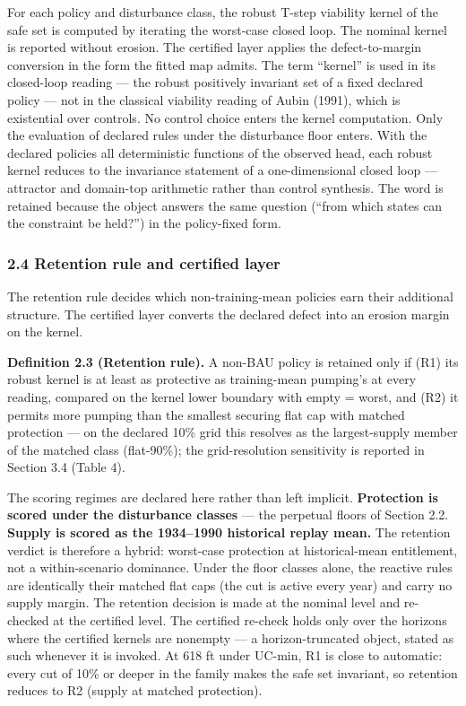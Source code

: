 \documentclass[11pt]{article}
\begin{document}
For each policy and disturbance class, the robust T-step viability
kernel of the safe set is computed by iterating the worst-case closed
loop. The nominal kernel is reported without erosion. The certified
layer applies the defect-to-margin conversion in the form the fitted map
admits. The term ``kernel'' is used in its closed-loop reading --- the
robust positively invariant set of a fixed declared policy --- not in
the classical viability reading of Aubin (1991), which is existential
over controls. No control choice enters the kernel computation. Only the
evaluation of declared rules under the disturbance floor enters. With
the declared policies all deterministic functions of the observed head,
each robust kernel reduces to the invariance statement of a
one-dimensional closed loop --- attractor and domain-top arithmetic
rather than control synthesis. The word is retained because the object
answers the same question (``from which states can the constraint be
held?'') in the policy-fixed form.

\subsubsection{2.4 Retention rule and certified
layer}\label{retention-rule-and-certified-layer}

The retention rule decides which non-training-mean policies earn their
additional structure. The certified layer converts the declared defect
into an erosion margin on the kernel.

\textbf{Definition 2.3 (Retention rule).} A non-BAU policy is retained
only if (R1) its robust kernel is at least as protective as
training-mean pumping's at every reading, compared on the kernel lower
boundary with empty = worst, and (R2) it permits more pumping than the
smallest securing flat cap with matched protection --- on the declared
10\% grid this resolves as the largest-supply member of the matched
class (flat-90\%); the grid-resolution sensitivity is reported in
Section 3.4 (Table 4).

The scoring regimes are declared here rather than left implicit.
\textbf{Protection is scored under the disturbance classes} --- the
perpetual floors of Section 2.2. \textbf{Supply is scored as the
1934--1990 historical replay mean.} The retention verdict is therefore a
hybrid: worst-case protection at historical-mean entitlement, not a
within-scenario dominance. Under the floor classes alone, the reactive
rules are identically their matched flat caps (the cut is active every
year) and carry no supply margin. The retention decision is made at the
nominal level and re-checked at the certified level. The certified
re-check holds only over the horizons where the certified kernels are
nonempty --- a horizon-truncated object, stated as such whenever it is
invoked. At 618 ft under UC-min, R1 is close to automatic: every cut of
10\% or deeper in the family makes the safe set invariant, so retention
reduces to R2 (supply at matched protection).
\end{document}
